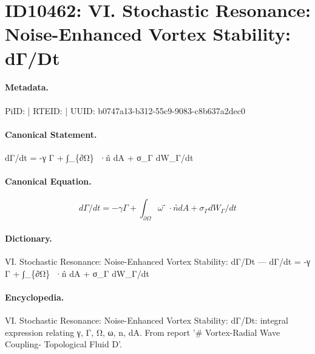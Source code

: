 \section*{ID10462: VI. Stochastic Resonance: Noise-Enhanced Vortex Stability: dΓ/Dt}
\paragraph{Metadata.}
PiID:  | RTEID:  | UUID: b0747a13-b312-55c9-9083-c8b637a2dec0

\paragraph{Canonical Statement.}
dΓ/dt = -γ Γ + ∫\_\{∂Ω\} ω⃗·n̂ dA + σ\_Γ dW\_Γ/dt

\paragraph{Canonical Equation.}
\[
dΓ/dt = -γ Γ + ∫_{∂Ω} ω⃗·n̂ dA + σ_Γ dW_Γ/dt
\]

\paragraph{Dictionary.}
VI. Stochastic Resonance: Noise-Enhanced Vortex Stability: dΓ/Dt — dΓ/dt = -γ Γ + ∫\_\{∂Ω\} ω⃗·n̂ dA + σ\_Γ dW\_Γ/dt

\paragraph{Encyclopedia.}
VI. Stochastic Resonance: Noise-Enhanced Vortex Stability: dΓ/Dt: integral expression relating γ, Γ, Ω, ω, n, dA. From report '\# Vortex-Radial Wave Coupling- Topological Fluid D'.
